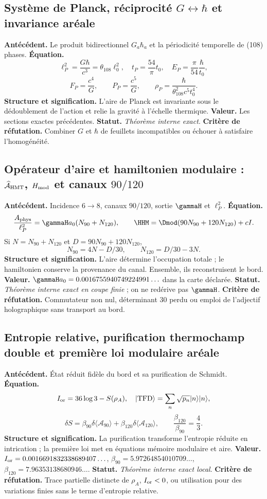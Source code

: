 \subsection*{Système de Planck, réciprocité \(G\leftrightarrow\hbar\) et invariance aréale}
\textbf{Antécédent.} Le produit bidirectionnel \(G_a\hbar_a\) et la périodicité temporelle de (108) phases.
\textbf{Équation.}
\[
\ell_P^2=\frac{G\hbar}{c^3}=\theta_{108}\ell_0^2,
\quad t_P=\frac{54}{\pi}t_0,
\quad E_P=\frac{\pi}{54}\frac{\hbar}{t_0},
\]
\[
F_P=\frac{c^4}{G},\qquad P_P=\frac{c^5}{G},\qquad
\rho_P=\frac{\hbar}{\theta_{108}^2c^5t_0^4}.
\]
\textbf{Structure et signification.} L'aire de Planck est invariante sous le
dédoublement de l'action et relie la gravité à l'échelle thermique.
\textbf{Valeur.} Les sections exactes précédentes.
\textbf{Statut.} \emph{Théorème interne exact}. \textbf{Critère de réfutation.} Combiner
\(G\) et \(\hbar\) de feuillets incompatibles ou échouer à satisfaire l'homogénéité.

\subsection*{Opérateur d'aire et hamiltonien modulaire : \(\widehat{\mathcal A}_{\rm HMT}\), \(H_{\rm mod}\) et canaux \(90/120\)}
\textbf{Antécédent.} Incidence \(6\to8\), canaux \(90/120\), sortie
\(\gammaH\) et \(\ell_P^2\). \textbf{Équation.}
\[
\frac{A_{\rm phys}}{\ell_P^2}=\gammaH a_0(N_{90}+N_{120}),
\qquad
\HHM=\Dmod(90N_{90}+120N_{120})+cI.
\]
Si \(N=N_{90}+N_{120}\) et
\(D=90N_{90}+120N_{120}\),
\[
N_{90}=4N-D/30,\qquad N_{120}=D/30-3N.
\]
\textbf{Structure et signification.} L'aire détermine l'occupation totale ; le
hamiltonien conserve la provenance du canal. Ensemble, ils reconstruisent le bord.
\textbf{Valeur.} \(\gammaH a_0=0.0016755940749224991\ldots\) dans la carte
déclarée. \textbf{Statut.} \emph{Théorème interne exact en coupe finie} ; on ne
redérive pas \(\gammaH\). \textbf{Critère de réfutation.} Commutateur non nul, déterminant
\(30\) perdu ou emploi de l'adjectif holographique sans transport au bord.

\subsection*{Entropie relative, purification thermochamp double et première loi modulaire aréale}
\textbf{Antécédent.} État réduit fidèle du bord et sa purification de
Schmidt. \textbf{Équation.}
\[
I_{\rm or}=36\log3-S(\rho_A),
\quad
|\mathrm{TFD}\rangle=\sum_n\sqrt{p_n}|n\rangle|n\rangle,
\]
\[
\delta S=\beta_{90}\delta\langle \mathcal A_{90}\rangle
+\beta_{120}\delta\langle \mathcal A_{120}\rangle,
\qquad \frac{\beta_{120}}{\beta_{90}}=\frac43.
\]
\textbf{Structure et signification.} La purification transforme l'entropie
réduite en intrication ; la première loi met en équations mémoire modulaire et aire.
\textbf{Valeur.} \(I_{\rm or}=0.0016691832338689407\ldots\),
\(\beta_{90}=5.97264854010709\ldots\),
\(\beta_{120}=7.96353138680946\ldots\).
\textbf{Statut.} \emph{Théorème interne exact local}. \textbf{Critère de réfutation.} Trace
partielle distincte de \(\rho_A\), \(I_{\rm or}<0\), ou utilisation pour des variations
finies sans le terme d'entropie relative.

